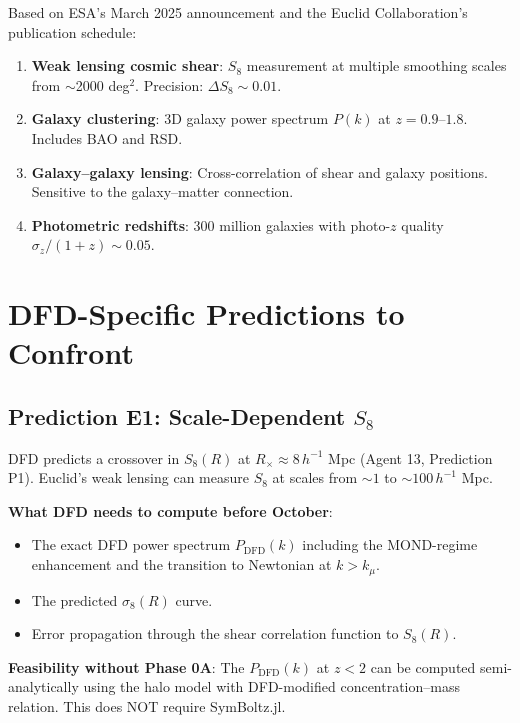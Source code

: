 \documentclass[11pt,a4paper]{article}
\begin{document}
Based on ESA's March 2025 announcement and the Euclid Collaboration's publication schedule:

\begin{enumerate}
\item \textbf{Weak lensing cosmic shear}: $S_8$ measurement at multiple smoothing scales from $\sim$2000 deg$^2$. Precision: $\Delta S_8 \sim 0.01$.

\item \textbf{Galaxy clustering}: 3D galaxy power spectrum $P(k)$ at $z = 0.9$--$1.8$. Includes BAO and RSD.

\item \textbf{Galaxy--galaxy lensing}: Cross-correlation of shear and galaxy positions. Sensitive to the galaxy--matter connection.

\item \textbf{Photometric redshifts}: 300 million galaxies with photo-$z$ quality $\sigma_z/(1+z) \sim 0.05$.
\end{enumerate}

\section{DFD-Specific Predictions to Confront}

\subsection{Prediction E1: Scale-Dependent $S_8$}

DFD predicts a crossover in $S_8(R)$ at $R_\times \approx 8\,h^{-1}$ Mpc (Agent 13, Prediction P1). Euclid's weak lensing can measure $S_8$ at scales from $\sim 1$ to $\sim 100\,h^{-1}$ Mpc.

\textbf{What DFD needs to compute before October}:
\begin{itemize}
\item The exact DFD power spectrum $P_{\mathrm{DFD}}(k)$ including the MOND-regime enhancement and the transition to Newtonian at $k > k_\mu$.
\item The predicted $\sigma_8(R)$ curve.
\item Error propagation through the shear correlation function to $S_8(R)$.
\end{itemize}

\textbf{Feasibility without Phase 0A}: The $P_{\mathrm{DFD}}(k)$ at $z < 2$ can be computed semi-analytically using the halo model with DFD-modified concentration--mass relation. This does NOT require SymBoltz.jl.
\end{document}
